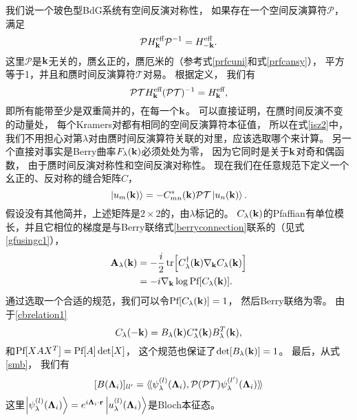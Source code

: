 我们说一个玻色型BdG系统有空间反演对称性，
如果存在一个空间反演算符$\mathcal P$，
满足
\begin{equation}
	\mathcal P H^{\text{eff}}_{\vb k} \mathcal P^{-1} = H^{\text{eff}}_{-\vb k}.\nonumber
\end{equation}
这里$\mathcal P$是$\vb k$无关的，赝幺正的，赝厄米的（参考式\eqref{prfcuni}和式\eqref{prfcansy}），
平方等于1，并且和赝时间反演算符$\mathcal T$对易。
根据定义，
我们有
\begin{equation}
	\mathcal P\mathcal T H^{\text{eff}}_{\vb k} (\mathcal P\mathcal T)^{-1} = H^{\text{eff}}_{\vb k},\nonumber
\end{equation}
即所有能带至少是双重简并的，在每一个$\vb k$。
可以直接证明，在赝时间反演不变的动量处，
每个Kramers对都有相同的空间反演算符本征值，
所以在式\eqref{isz2}中，我们不用担心对第$\lambda $对由赝时间反演算符关联的对里，应该选取哪个来计算。
另一个直接对事实是Berry曲率$F_\lambda (\vb k)$必须处处为零，
因为它同时是关于$\vb k$对奇和偶函数，
由于赝时间反演对称性和空间反演对称性。
现在我们在任意规范下定义一个幺正的、反对称的缝合矩阵$C$，
\begin{equation}
	\ket{u_m(\vb k)}= -C^*_{mn}(\vb k)\mathcal P\mathcal T\ket{u_n(\vb k)}.\label{sewmatcdef}
\end{equation}
假设没有其他简并，上述矩阵是$2\times 2$的，由$\lambda $标记的。
$C_\lambda (\vb k)$的Pfaffian有单位模长，并且它相位的梯度是与Berry联络式\eqref{berryconnection}联系的（见式\ref{gfusingc1}），
\begin{equation}\label{gfusingc}
	\begin{split}
		\vb A_\lambda (\vb k) &=-\frac{i}{2}\tr[C^\dagger_\lambda (\vb k) \nabla_{\vb k}C_\lambda (\vb k)]\\
		&=-i \nabla_{\vb k}\log \textnormal{Pf}[C_\lambda (\vb k)].
	\end{split}
\end{equation}
通过选取一个合适的规范，我们可以令$\textnormal{Pf}[C_\lambda (\vb k)]=1$，
然后Berry联络为零。
由于\ref{cbrelation1}
\begin{equation}\label{cbrelation}
	C_\lambda (-\vb k)=B_\lambda (\vb k)C^*_\lambda (\vb k) B^T_\lambda (\vb k),
\end{equation}
和$\textnormal{Pf}[XAX^T]=\textnormal{Pf}[A]\det[X]$，
这个规范也保证了$\det[B_\lambda (\vb k)]=1$。
最后，从式\eqref{smb}，
我们有
\begin{equation}\label{bc1}
	[B(\boldsymbol{\Lambda} _i)]_{ll'}=\langle\!\langle \psi_\lambda ^{(l)}(\boldsymbol{\Lambda} _i),\mathcal P(\mathcal P\mathcal T)\psi_\lambda ^{(l')}(\boldsymbol{\Lambda} _i) \rangle\!\rangle
\end{equation}
这里$\ket{\psi_\lambda ^{(l)}(\boldsymbol{\Lambda} _i)}=e^{i\boldsymbol{\Lambda} _i\cdot\vb r}\ket{u_\lambda ^{(l)}(\boldsymbol{\Lambda} _i)}$是Bloch本征态。
